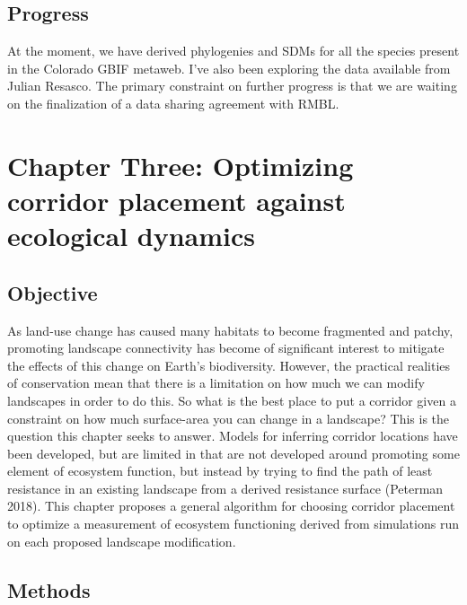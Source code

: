 \documentclass[10pt,oneside]{article}
\begin{document}
\hypertarget{progress-1}{%
\subsection{Progress}\label{progress-1}}

At the moment, we have derived phylogenies and SDMs for all the species
present in the Colorado GBIF metaweb. I've also been exploring the data
available from Julian Resasco. The primary constraint on further
progress is that we are waiting on the finalization of a data sharing
agreement with RMBL.

\hypertarget{chapter-three-optimizing-corridor-placement-against-ecological-dynamics}{%
\section{Chapter Three: Optimizing corridor placement against ecological
dynamics}\label{chapter-three-optimizing-corridor-placement-against-ecological-dynamics}}

\hypertarget{objective-1}{%
\subsection{Objective}\label{objective-1}}

As land-use change has caused many habitats to become fragmented and
patchy, promoting landscape connectivity has become of significant
interest to mitigate the effects of this change on Earth's biodiversity.
However, the practical realities of conservation mean that there is a
limitation on how much we can modify landscapes in order to do this. So
what is the best place to put a corridor given a constraint on how much
surface-area you can change in a landscape? This is the question this
chapter seeks to answer. Models for inferring corridor locations have
been developed, but are limited in that are not developed around
promoting some element of ecosystem function, but instead by trying to
find the path of least resistance in an existing landscape from a
derived resistance surface (Peterman 2018). This chapter proposes a
general algorithm for choosing corridor placement to optimize a
measurement of ecosystem functioning derived from simulations run on
each proposed landscape modification.

\hypertarget{methods-2}{%
\subsection{Methods}\label{methods-2}}
\end{document}
